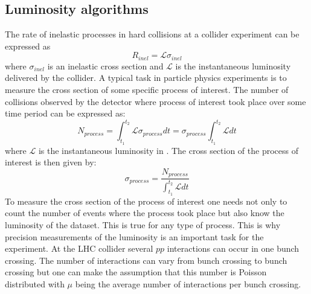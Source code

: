 


\subsection{Luminosity algorithms}
The rate of inelastic processes in hard collisions at a collider experiment can be expressed as
\begin{equation}
R_{inel} = \mathscr{L} \sigma_{inel}
\label{eq:simpleLumi}
\end{equation}
where $\sigma_{inel}$ is an inelastic cross section and $\mathscr{L}$ is the instantaneous luminosity delivered by the collider.
A typical task in particle physics experiments is to measure the cross section of some specific process of interest.
The number of collisions observed by the detector where process of interest took place over some time period can be expressed as:
\begin{equation}
N_{process} = \int_{t_{1}}^{t_{2}} \mathscr{L} \sigma_{process} dt = \sigma_{process} \int_{t_{1}}^{t_{2}} \mathscr{L} dt
\label{eq:simpleLumi2}
\end{equation}
where $\mathscr{L}$ is the instantaneous luminosity in .
The cross section of the process of interest is then given by:
\begin{equation}
\sigma_{process} = \dfrac{N_{process}}{  \int_{t_{1}}^{t_{2}} \mathscr{L} dt}
\label{eq:sigma_proc}
\end{equation}
To measure the cross section of the process of interest one needs not only to count the number of events where the process took place but also know the luminosity of the dataset.
This is true for any type of process. 
This is why precision measurements of the luminosity is an important task for the experiment.
At the LHC collider several $pp$ interactions can occur in one bunch crossing. 
The number of interactions can vary from bunch crossing to bunch crossing but one can make the assumption that this number is Poisson distributed 
with $\mu$ being the average number of interactions per bunch crossing.
